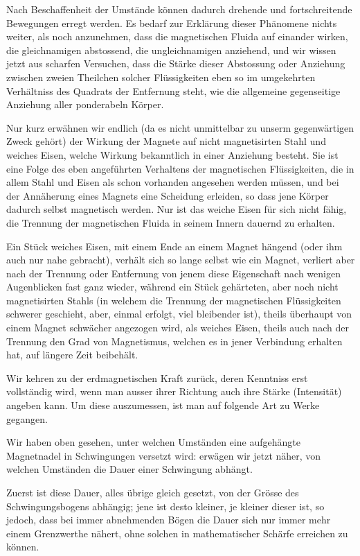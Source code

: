 \documentclass[12pt,a4paper]{article}
\begin{document}
Nach Beschaffenheit der Umstände können dadurch drehende und fortschreitende Bewegungen erregt werden. Es bedarf zur Erklärung dieser Phänomene nichts weiter, als noch anzunehmen, dass die magnetischen Fluida auf einander wirken, die gleichnamigen abstossend, die ungleichnamigen anziehend, und wir wissen jetzt aus scharfen Versuchen, dass die Stärke dieser Abstossung oder Anziehung zwischen zweien Theilchen solcher Flüssigkeiten eben so im umgekehrten Verhältniss des Quadrats der Entfernung steht, wie die allgemeine gegenseitige Anziehung aller ponderabeln Körper.

Nur kurz erwähnen wir endlich (da es nicht unmittelbar zu unserm gegenwärtigen Zweck gehört) der Wirkung der Magnete auf nicht magnetisirten Stahl und weiches Eisen, welche Wirkung bekanntlich in einer Anziehung besteht. Sie ist eine Folge des eben angeführten Verhaltens der magnetischen Flüssigkeiten, die in allem Stahl und Eisen als schon vorhanden angesehen werden müssen, und bei der Annäherung eines Magnets eine Scheidung erleiden, so dass jene Körper dadurch selbst magnetisch werden. Nur ist das weiche Eisen für sich nicht fähig, die Trennung der magnetischen Fluida in seinem Innern dauernd zu erhalten.

Ein Stück weiches Eisen, mit einem Ende an einem Magnet hängend (oder ihm auch nur nahe gebracht), verhält sich so lange selbst wie ein Magnet, verliert aber nach der Trennung oder Entfernung von jenem diese Eigenschaft nach wenigen Augenblicken fast ganz wieder, während ein Stück gehärteten, aber noch nicht magnetisirten Stahls (in welchem die Trennung der magnetischen Flüssigkeiten schwerer geschieht, aber, einmal erfolgt, viel bleibender ist), theils überhaupt von einem Magnet schwächer angezogen wird, als weiches Eisen, theils auch nach der Trennung den Grad von Magnetismus, welchen es in jener Verbindung erhalten hat, auf längere Zeit beibehält.

\bigskip

Wir kehren zu der erdmagnetischen Kraft zurück, deren Kenntniss erst vollständig wird, wenn man ausser ihrer Richtung auch ihre Stärke (Intensität) angeben kann. Um diese auszumessen, ist man auf folgende Art zu Werke gegangen.

Wir haben oben gesehen, unter welchen Umständen eine aufgehängte Magnetnadel in Schwingungen versetzt wird: erwägen wir jetzt näher, von welchen Umständen die Dauer einer Schwingung abhängt.

Zuerst ist diese Dauer, alles übrige gleich gesetzt, von der Grösse des Schwingungsbogens abhängig; jene ist desto kleiner, je kleiner dieser ist, so jedoch, dass bei immer abnehmenden Bögen die Dauer sich nur immer mehr einem Grenzwerthe nähert, ohne solchen in mathematischer Schärfe erreichen zu können.
\end{document}
